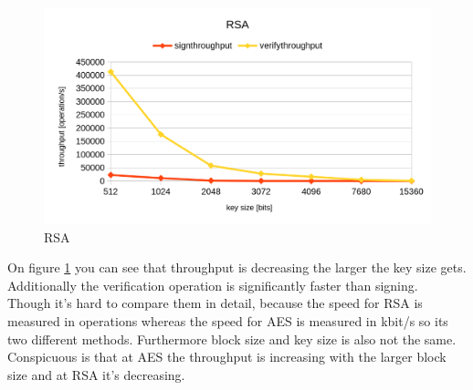 \begin{figure}[htp]
    \centering
    \caption{RSA}
    \label{fig:rsa}
    \includegraphics[width=\textwidth]{rsa.png}
\end{figure}
On figure \ref{fig:rsa} you can see that throughput is decreasing the larger the key size gets. Additionally the verification operation is significantly faster than signing.\\
Though it's hard to compare them in detail, because the speed for RSA is measured in operations whereas the speed for AES is measured in kbit/s so its two different methods. Furthermore block size and key size is also not the same. Conspicuous is that at AES the throughput is increasing with the larger block size and at RSA it's decreasing.